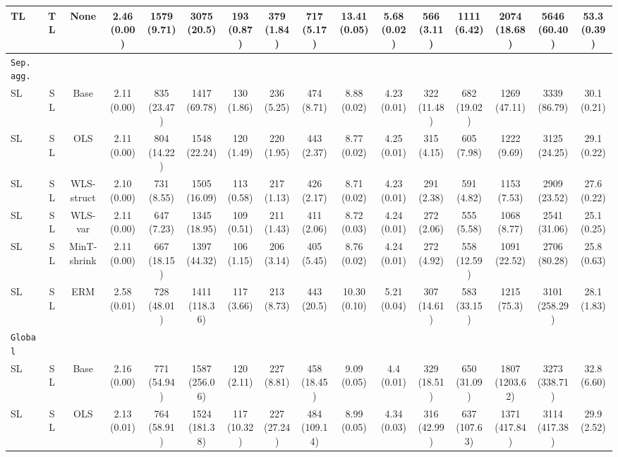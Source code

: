 \documentclass[preprint, 3p, times, twocolumn]{elsarticle}
\begin{document}
\begin{table}
\begin{center}
{{\begin{tabular}{l c cccccccccccccc}
  \hspace{0.1cm} 	TL	&TL	&None	&2.46 (0.00)	&1579 (9.71)	&3075 (20.5)	&193 (0.87)	&379 (1.84)	&717 (5.17)	&13.41 (0.05)	&5.68 (0.02)	&566 (3.11)	&1111 (6.42)	&2074 (18.68)	&5646 (60.40)	&53.3 (0.39)	\\
  \midrule																	
  \texttt{Sep. agg.}																	\\
  \hspace{0.1cm} 	SL	&SL	&Base	&2.11 (0.00)	&835 (23.47)	&1417 (69.78)	&130 (1.86)	&236 (5.25)	&474 (8.71)	&8.88 (0.02)	&4.23 (0.01)	&322 (11.48)	&682 (19.02)	&1269 (47.11)	&3339 (86.79)	&30.1 (0.21)	\\
  \hspace{0.1cm} 	SL	&SL	&OLS	&2.11 (0.00)	&804 (14.22)	&1548 (22.24)	&120 (1.49)	&220 (1.95)	&443 (2.37)	&8.77 (0.02)	&4.25 (0.01)	&315 (4.15)	&605 (7.98)	&1222 (9.69)	&3125 (24.25)	&29.1 (0.22)	\\
  \hspace{0.1cm} 	SL	&SL	&WLS-struct	&2.10 (0.00)	&731 (8.55)	&1505 (16.09)	&113 (0.58)	&217 (1.13)	&426 (2.17)	&8.71 (0.02)	&4.23 (0.01)	&291 (2.38)	&591 (4.82)	&1153 (7.53)	&2909 (23.52)	&27.6 (0.22)	\\
  \hspace{0.1cm} 	SL	&SL	&WLS-var	&2.11 (0.00)	&647 (7.23)	&1345 (18.95)	&109 (0.51)	&211 (1.43)	&411 (2.06)	&8.72 (0.03)	&4.24 (0.01)	&272 (2.06)	&555 (5.58)	&1068 (8.77)	&2541 (31.06)	&25.1 (0.25)	\\
  \hspace{0.1cm} 	SL	&SL	&MinT-shrink	&2.11 (0.00)	&667 (18.15)	&1397 (44.32)	&106 (1.15)	&206 (3.14)	&405 (5.45)	&8.76 (0.02)	&4.24 (0.01)	&272 (4.92)	&558 (12.59)	&1091 (22.52)	&2706 (80.28)	&25.8 (0.63)	\\
  \hspace{0.1cm} 	SL	&SL	&ERM	&2.58 (0.01)	&728 (48.01)	&1411 (118.36)	&117 (3.66)	&213 (8.73)	&443 (20.5)	&10.30 (0.10)	&5.21 (0.04)	&307 (14.61)	&583 (33.15)	&1215 (75.3)	&3101 (258.29)	&28.1 (1.83)	\\
  \midrule																	
  \texttt{Global}																	\\
  \hspace{0.1cm} 	SL	&SL	&Base	&2.16 (0.00)	&771 (54.94)	&1587 (256.06)	&120 (2.11)	&227 (8.81)	&458 (18.45)	&9.09 (0.05)	&4.4 (0.01)	&329 (18.51)	&650 (31.09)	&1807 (1203.62)	&3273 (338.71)	&32.8 (6.60)	\\
  \hspace{0.1cm} 	SL	&SL	&OLS	&2.13 (0.01)	&764 (58.91)	&1524 (181.38)	&117 (10.32)	&227 (27.24)	&484 (109.14)	&8.99 (0.05)	&4.34 (0.03)	&316 (42.99)	&637 (107.63)	&1371 (417.84)	&3114 (417.38)	&29.9 (2.52)	\\

\end{tabular}}}
\end{center}
\end{table}
\end{document}
